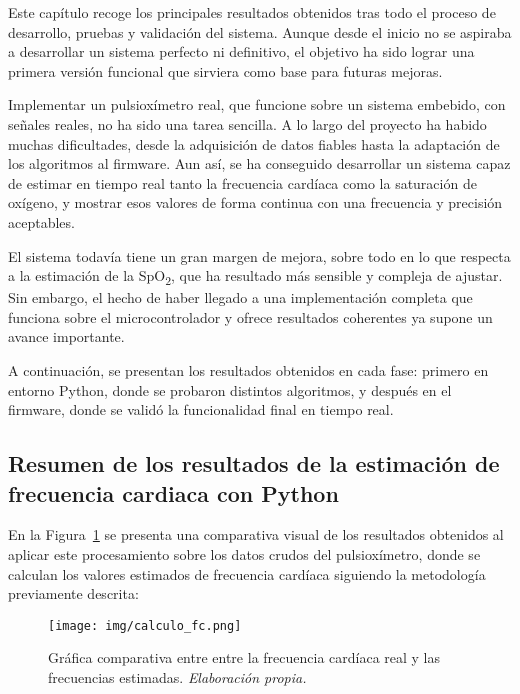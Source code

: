 
Este capítulo recoge los principales resultados obtenidos tras todo el proceso de desarrollo, pruebas y validación del sistema. Aunque desde el inicio no se aspiraba a desarrollar un sistema perfecto ni definitivo, el objetivo ha sido lograr una primera versión funcional que sirviera como base para futuras mejoras.

Implementar un pulsioxímetro real, que funcione sobre un sistema embebido, con señales reales, no ha sido una tarea sencilla. A lo largo del proyecto ha habido muchas dificultades, desde la adquisición de datos fiables hasta la adaptación de los algoritmos al firmware. Aun así, se ha conseguido desarrollar un sistema capaz de estimar en tiempo real tanto la frecuencia cardíaca como la saturación de oxígeno, y mostrar esos valores de forma continua con una frecuencia y precisión aceptables.

El sistema todavía tiene un gran margen de mejora, sobre todo en lo que respecta a la estimación de la SpO\textsubscript{2}, que ha resultado más sensible y compleja de ajustar. Sin embargo, el hecho de haber llegado a una implementación completa que funciona sobre el microcontrolador y ofrece resultados coherentes ya supone un avance importante.

A continuación, se presentan los resultados obtenidos en cada fase: primero en entorno Python, donde se probaron distintos algoritmos, y después en el firmware, donde se validó la funcionalidad final en tiempo real.

\subsection{Resumen de los resultados de la estimación de frecuencia cardiaca con Python}

En la Figura~\ref{fig:comparacion_fc_algoritmos} se presenta una comparativa visual de los resultados obtenidos al aplicar este procesamiento sobre los datos crudos del pulsioxímetro, donde se calculan los valores estimados de frecuencia cardíaca siguiendo la metodología previamente descrita:

\begin{figure}[H]
    \centering
    \texttt{[image: img/calculo\_fc.png]}
    \caption{Gráfica comparativa entre entre la frecuencia cardíaca real y las frecuencias estimadas. \textit{Elaboración propia.}}
    \label{fig:comparacion_fc_algoritmos}
\end{figure}


